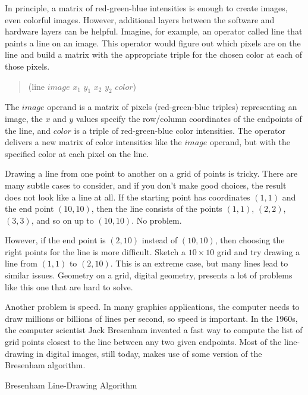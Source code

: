 In principle, a matrix of red-green-blue
intensities is
enough to create images, even colorful images.
However, additional layers between the software and hardware
layers can be helpful. Imagine, for example, an operator called \textsf{line}
that paints a line on an image. This operator would figure out
which pixels are on the line and build a matrix with
the appropriate triple for the chosen color at each of those pixels.
\begin{quote}
    \textsf{(line} $image$ $x_1$ $y_1$ $x_2$ $y_2$ $color$\textsf{)}
\end{quote}
The $image$ operand is a matrix of pixels (red-green-blue triples)
representing an image, the $x$ and $y$ values
specify the row/column coordinates of the endpoints of the line,
and $color$ is a triple of red-green-blue color intensities.
The operator delivers a new matrix of color intensities
like the $image$ operand, but with the specified color
at each pixel on the line.

\begin{aside}
Drawing a line from one point to another on a grid of points is tricky.
There are many subtle cases to consider, and
if you don't make good choices, the result does not look
like a line at all. If the starting point has
coordinates $(1,1)$ and the end point $(10,10)$,
then the line consists of the points $(1,1)$,
$(2,2)$, $(3,3)$, and so on up to $(10,10)$.
No problem.

However, if the end point is $(2,10)$ instead of $(10,10)$,
then choosing the right points for the line is more difficult.
Sketch a $10\times10$ grid and try drawing a line
from  $(1,1)$ to  $(2,10)$.
This is an extreme case, but many lines lead to similar issues.
Geometry on a grid,
digital geometry,
presents a lot of problems like this one that are hard to solve.

Another problem is speed. In many graphics applications, the
computer needs to draw millions or billions of lines per second,
so speed is important.
In the 1960s, the computer scientist
Jack Bresenham invented
a fast way to compute the list of grid points closest to the line
between any two given endpoints.
Most of the line-drawing in digital images, still today,
makes use of some version of the Bresenham algorithm.
\caption{Bresenham Line-Drawing Algorithm}
\label{aside:Bresenham}
\end{aside}

